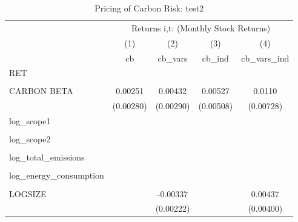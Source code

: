 \begin{table}[htbp]\centering
\def\sym#1{\ifmmode^{#1}\else\(^{#1}\)\fi}
\caption{Pricing of Carbon Risk: test2}
\begin{tabular}{l*{4}{c}}
\hline\hline
                &\multicolumn{4}{c}{Returns i,t: (Monthly Stock Returns) }                  \\\cmidrule(lr){2-5}
                &\multicolumn{1}{c}{(1)}         &\multicolumn{1}{c}{(2)}         &\multicolumn{1}{c}{(3)}         &\multicolumn{1}{c}{(4)}         \\
                &       cb         &  cb\_vars         &   cb\_ind         &cb\_vars\_ind         \\
\hline
RET             &                  &                  &                  &                  \\
                &                  &                  &                  &                  \\
CARBON BETA     &  0.00251         &  0.00432         &  0.00527         &   0.0110         \\
                &(0.00280)         &(0.00290)         &(0.00508)         &(0.00728)         \\
log\_scope1      &                  &                  &                  &                  \\
                &                  &                  &                  &                  \\
log\_scope2      &                  &                  &                  &                  \\
                &                  &                  &                  &                  \\
log\_total\_emissions&                  &                  &                  &                  \\
                &                  &                  &                  &                  \\
log\_energy\_consumption&                  &                  &                  &                  \\
                &                  &                  &                  &                  \\
LOGSIZE         &                  & -0.00337         &                  &  0.00437         \\
                &                  &(0.00222)         &                  &(0.00400)         \\

\end{tabular}
\end{table}
